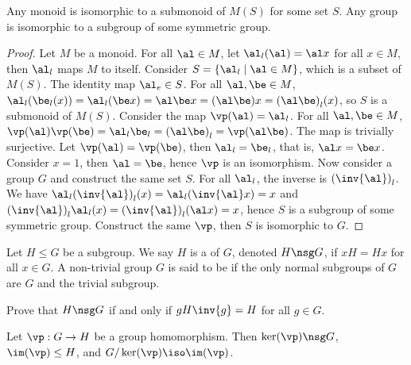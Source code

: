 \documentclass[10pt]{article}
\begin{document}
\begin{theorem}
    Any monoid is isomorphic to a submonoid of $M(S)$ for some set $S$. Any group is isomorphic to a subgroup of some symmetric group.
\end{theorem}
\begin{proof}
    Let $M$ be a monoid. For all $\al\in M$, let ${\al}_{l}(\al)=\al x$ for all $x\in M$, then ${\al}_{l}$ maps $M$ to itself. Consider $S=\{{\al}_{l}\mid\al\in M\}$, which is a subset of $M(S)$. The identity map ${\al}_{e}\in S$. For all $\al,\be\in M$, ${\al}_{l}({\be}_{l}(x))={\al}_{l}(\be x)=\al\be x=(\al\be)x={(\al\be)}_{l}(x)$, so $S$ is a submonoid of $M(S)$. Consider the map $\vp(\al)={\al}_{l}$. For all $\al,\be\in M$, $\vp(\al)\vp(\be)={\al}_{l}{\be}_{l}={(\al\be)}_{l}=\vp(\al\be)$. The map is trivially surjective. Let $\vp(\al)=\vp(\be)$, then ${\al}_{l}={\be}_{l}$, that is, $\al x=\be x$. Consider $x=1$, then $\al=\be$, hence $\vp$ is an isomorphism. Now consider a group $G$ and construct the same set $S$. For all ${\al}_{l}$, the inverse is ${(\inv{\al})}_{l}$. We have ${\al}_{l}{(\inv{\al})}_{l}(x)={\al}_{l}(\inv{\al}x)=x$ and ${(\inv{\al})}_{l}{\al}_{l}(x)={(\inv{\al})}_{l}(\al x)=x$, hence $S$ is a subgroup of some symmetric group. Construct the same $\vp$, then $S$ is isomorphic to $G$.
\end{proof}
\begin{definition}
    Let $H\le G$ be a subgroup. We say $H$ is a  of $G$, denoted $H\nsg G$, if $xH=Hx$ for all $x\in G$. A non-trivial group $G$ is said to be  if the only normal subgroups of $G$ are $G$ and the trivial subgroup.
\end{definition}
\begin{problem}
    Prove that $H\nsg G$ if and only if $gH\inv{g}=H$ for all $g\in G$.
\end{problem}
\begin{theorem}
    Let $\vp:G\to H$ be a group homomorphism. Then $\ker(\vp)\nsg G$, $\im(\vp)\le H$, and $G/\ker(\vp)\iso\im(\vp)$.
\end{theorem}
\begin{center}
\end{center}
\end{document}
